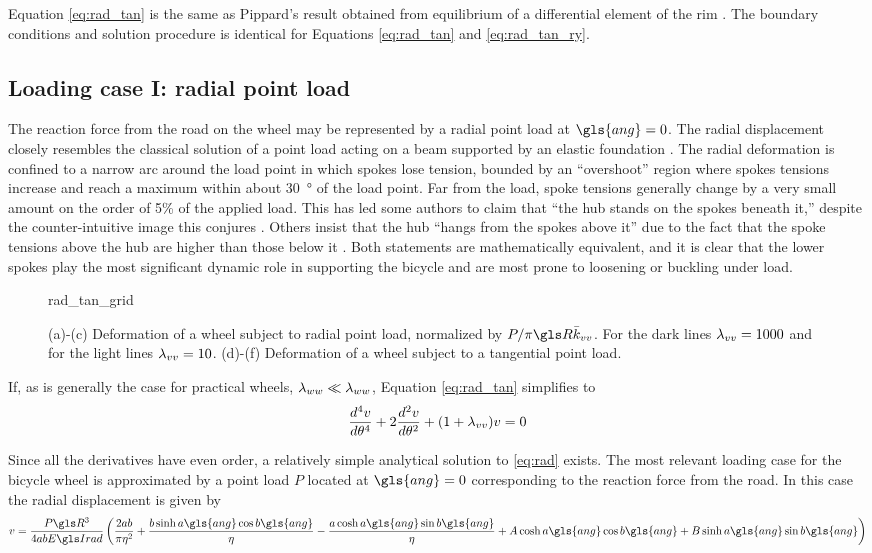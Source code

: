 \documentclass[\rootdir/thesis.tex]{subfiles}
\begin{document}
Equation \eqref{eq:rad_tan} is the same as Pippard’s result obtained from equilibrium of a differential element of the rim \cite{Pippard1932b}. The boundary conditions and solution procedure is identical for Equations \eqref{eq:rad_tan} and \eqref{eq:rad_tan_ry}.

\subsection{Loading case I: radial point load}

The reaction force from the road on the wheel may be represented by a radial point load at $\gls{ang}=0$. The radial displacement closely resembles the classical solution of a point load acting on a beam supported by an elastic foundation \cite{Hetenyi1946}. The radial deformation is confined to a narrow arc around the load point in which spokes lose tension, bounded by an ``overshoot'' region where spokes tensions increase and reach a maximum within about \SI{30}{\degree} of the load point. Far from the load, spoke tensions generally change by a very small amount on the order of 5\% of the applied load. This has led some authors to claim that ``the hub stands on the spokes beneath it,'' despite the counter-intuitive image this conjures \cite{Brandt1993,Forester1980}. Others insist that the hub ``hangs from the spokes above it'' due to the fact that the spoke tensions above the hub are higher than those below it \cite{Fine1998}. Both statements are mathematically equivalent, and it is clear that the lower spokes play the most significant dynamic role in supporting the bicycle and are most prone to loosening or buckling under load.

\begin{figure}
\centering
{rad_tan_grid}
\caption{(a)-(c) Deformation of a wheel subject to radial point load, normalized by $P/\pi\R\kvv$. For the dark lines $\lambda_{vv}=1000$ and for the light lines $\lambda_{vv}=10$. (d)-(f) Deformation of a wheel subject to a tangential point load.}
\label{fig:rad_tan_grid}
\end{figure}

If, as is generally the case for practical wheels, $\lambda_{ww} \ll \lambda_{ww}$, Equation \eqref{eq:rad_tan} simplifies to
\begin{equation}
\label{eq:rad}
\frac{d^4v}{d\theta^4} + 2\frac{d^2v}{d\theta^2} + (1+\lambda_{vv})v=0
\end{equation}

Since all the derivatives have even order, a relatively simple analytical solution to \eqref{eq:rad} exists. The most relevant loading case for the bicycle wheel is approximated by a point load $P$ located at $\gls{ang}=0$ corresponding to the reaction force from the road. In this case the radial displacement is given by
\begin{equation}
\label{eq:rad_soln}
v = \frac{P\R^3}{4ab\EIr} \left( \frac{2ab}{\pi\eta^2} + \frac{b\sinh{a\gls{ang}}\cos{b\gls{ang}}}{\eta} 
                               -\frac{a\cosh{a\gls{ang}}\sin{b\gls{ang}}}{\eta}
                               +A\cosh{a\gls{ang}}\cos{b\gls{ang}} + B\sinh{a\gls{ang}}\sin{b\gls{ang}}\right)
\end{equation}
\end{document}
